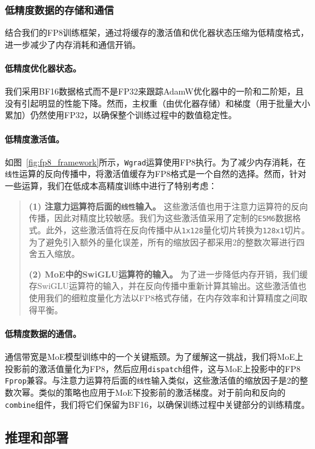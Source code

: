 \documentclass[lang=cn,a4paper,newtx]{elegantpaper}
\begin{document}
\subsubsection{低精度数据的存储和通信}

结合我们的FP8训练框架，通过将缓存的激活值和优化器状态压缩为低精度格式，进一步减少了内存消耗和通信开销。

\paragraph{低精度优化器状态。}
我们采用BF16数据格式而不是FP32来跟踪AdamW优化器中的一阶和二阶矩，且没有引起明显的性能下降。然而，主权重（由优化器存储）和梯度（用于批量大小累加）仍然使用FP32，以确保整个训练过程中的数值稳定性。

\paragraph{低精度激活值。}
如图~\ref{fig:fp8_framework}所示，\texttt{Wgrad}运算使用FP8执行。为了减少内存消耗，在\texttt{线性}运算的反向传播中，将激活值缓存为FP8格式是一个自然的选择。然而，针对一些运算，我们在低成本高精度训练中进行了特别考虑：

\begin{quote}
\textbf{(1) 注意力运算符后面的\texttt{线性}输入。} 这些激活值也用于注意力运算符的反向传播，因此对精度比较敏感。我们为这些激活值采用了定制的\texttt{E5M6}数据格式。此外，这些激活值将在反向传播中从\texttt{1x128}量化切片转换为\texttt{128x1}切片。为了避免引入额外的量化误差，所有的缩放因子都采用2的整数次幂进行四舍五入缩放。

\textbf{(2) MoE中的SwiGLU运算符的输入。} 为了进一步降低内存开销，我们缓存SwiGLU运算符的输入，并在反向传播中重新计算其输出。这些激活值也使用我们的细粒度量化方法以FP8格式存储，在内存效率和计算精度之间取得平衡。
\end{quote}

\paragraph{低精度数据的通信。}
通信带宽是MoE模型训练中的一个关键瓶颈。为了缓解这一挑战，我们将MoE上投影前的激活值量化为FP8，然后应用\texttt{dispatch}组件，这与MoE上投影中的FP8 \texttt{Fprop}兼容。与注意力运算符后面的\texttt{线性}输入类似，这些激活值的缩放因子是2的整数次幂。类似的策略也应用于MoE下投影前的激活梯度。对于前向和反向的\texttt{combine}组件，我们将它们保留为BF16，以确保训练过程中关键部分的训练精度。

\subsection{推理和部署}
\label{sec:inference_deployment}
\end{document}
